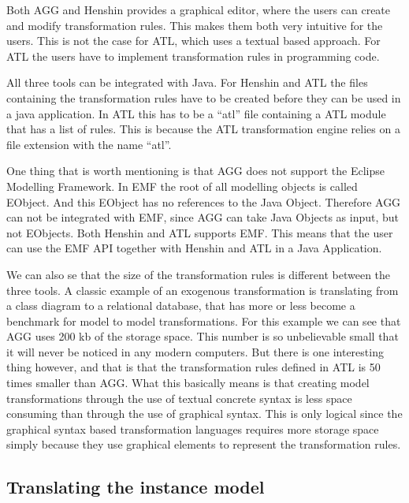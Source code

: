 Both AGG and Henshin provides a graphical editor, where the users can create and
modify transformation rules. This makes them both very intuitive for the users.
This is not the case for ATL, which uses a textual based approach. For ATL the
users have to implement transformation rules in programming code.

All three tools can be integrated with Java. For Henshin and ATL the files
containing the transformation rules have to be created before they can be used
in a java application. In ATL this has to be a ``atl'' file containing a ATL
module that has a list of rules. This is because the ATL transformation engine
relies on a file extension with the name ``atl''.

One thing that is worth mentioning is that AGG does not support the Eclipse
Modelling Framework. In EMF the root of all modelling objects is called
EObject. And this EObject has no references to the Java Object. Therefore AGG
can not be integrated with EMF, since AGG can take Java Objects as input,
but not EObjects. Both Henshin and ATL supports EMF. This means that the user
can use the EMF API together with Henshin and ATL in a Java Application.

We can also se that the size of the transformation rules is different
between the three tools. A classic example of an exogenous transformation is
translating from a class diagram to a relational database, that has more or less become a
benchmark for model to model transformations. For this example we can see that
AGG uses 200 kb of the storage space. This number is so unbelievable small
that it will never be noticed in any modern computers. But there is one
interesting thing however, and that is that the transformation rules defined in
ATL is 50 times smaller than AGG. What this basically means is that creating model
transformations through the use of textual concrete syntax is less space
consuming than through the use of graphical syntax. This is only logical since
the graphical syntax based transformation languages requires more storage
space simply because they use graphical elements to represent the transformation
rules.

\subsection{Translating the instance model}

